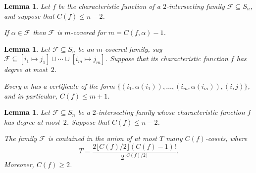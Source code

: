 \documentclass[10pt,a4paper]{article}
\newtheorem{lemma}[theorem]{Lemma}
\theoremstyle{definition}
\providecommand{\coset}[2]{[#1 \mapsto #2]}
\begin{document}
\begin{lemma} \label{lem:covering-sym}
Let $f$ be the characteristic function of a $2$-intersecting family $\mathcal{F} \subseteq S_n$, and suppose that $C(f) \leq n-2$.

If $\alpha \in \mathcal{F}$ then $\mathcal{F}$ is $m$-covered for $m = C(f,\alpha) - 1$.
\end{lemma}

\begin{lemma} \label{lem:structure-sym}
Let $\mathcal{F} \subseteq S_n$ be an $m$-covered family, say $\mathcal{F} \subseteq \coset{i_1}{j_1} \cup \cdots \cup \coset{i_m}{j_m}$. Suppose that its characteristic function $f$ has degree at most~$2$.

Every $\alpha$ has a certificate of the form $\{(i_1,\alpha(i_1)),\ldots,(i_m,\alpha(i_m)),(i,j)\}$, and in particular, $C(f) \leq m + 1$.
\end{lemma}

\begin{lemma} \label{lem:main-ub-sym}
Let $\mathcal{F} \subseteq S_n$ be a $2$-intersecting family whose characteristic function $f$ has degree at most~$2$. Suppose that $C(f) \leq n-2$.

The family $\mathcal{F}$ is contained in the union of at most $T$ many $C(f)$-cosets, where
\[
 T = \frac{2\lfloor C(f)/2 \rfloor (C(f) - 1)!}{2^{\lfloor C(f)/2 \rfloor}}.
\]
Moreover, $C(f) \geq 2$.
\end{lemma}
\end{document}

